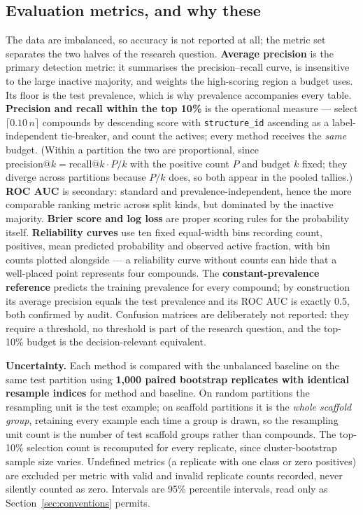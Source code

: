 \documentclass[10pt,letterpaper]{article}
\begin{document}
\subsection{Evaluation metrics, and why these}
\label{sec:metrics}

The data are imbalanced, so accuracy is not reported at all; the metric set separates the two halves
of the research question.
\textbf{Average precision} is the primary detection metric: it summarises the precision--recall
curve, is insensitive to the large inactive majority, and weights the high-scoring region a budget
uses. Its floor is the test prevalence, which is why prevalence accompanies every table.
\textbf{Precision and recall within the top 10\%} is the operational measure --- select
$\lceil 0.10\,n\rceil$ compounds by descending score with \texttt{structure\_id} ascending as a
label-independent tie-breaker, and count the actives; every method receives the \emph{same} budget.
(Within a partition the two are proportional, since $\text{precision}@k = \text{recall}@k \cdot P/k$
with the positive count $P$ and budget $k$ fixed; they diverge across partitions because $P/k$ does,
so both appear in the pooled tallies.) \textbf{ROC AUC} is secondary: standard and
prevalence-independent, hence the more comparable ranking metric across split kinds, but dominated
by the inactive majority. \textbf{Brier score and log loss} are proper scoring rules for the
probability itself. \textbf{Reliability curves} use ten fixed equal-width bins recording count,
positives, mean predicted probability and observed active fraction, with bin counts plotted
alongside --- a reliability curve without counts can hide that a well-placed point represents four
compounds. The \textbf{constant-prevalence reference} predicts the training prevalence for every
compound; by construction its average precision equals the test prevalence and its ROC AUC is
exactly 0.5, both confirmed by audit. Confusion matrices are deliberately not reported: they require
a threshold, no threshold is part of the research question, and the top-10\% budget is the
decision-relevant equivalent.

\textbf{Uncertainty.} Each method is compared with the unbalanced baseline on the same test partition
using \textbf{1{,}000 paired bootstrap replicates with identical resample indices} for method and
baseline. On random partitions the resampling unit is the test example; on scaffold partitions it is
the \emph{whole scaffold group}, retaining every example each time a group is drawn, so the
resampling unit count is the number of test scaffold groups rather than compounds. The top-10\%
selection count is recomputed for every replicate, since cluster-bootstrap sample size varies.
Undefined metrics (a replicate with one class or zero positives) are excluded per metric with valid
and invalid replicate counts recorded, never silently counted as zero. Intervals are 95\% percentile
intervals, read only as Section~\ref{sec:conventions} permits.
\end{document}
